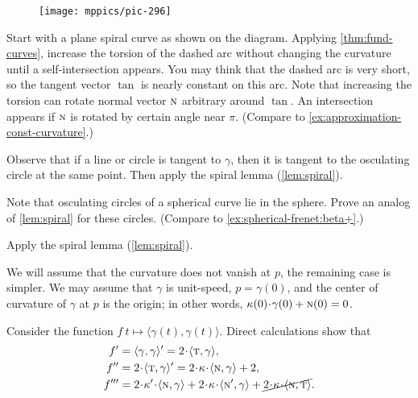 \begin{multicols}{2}
\begin{wrapfigure}{r}{15 mm}
\vskip-5mm
\centering
\texttt{[image: mppics/pic-296]}
\vskip-3mm
\end{wrapfigure}

Start with a plane spiral curve as shown on the diagram.
Applying \ref{thm:fund-curves}, increase the torsion of the dashed arc without changing the curvature until a self-intersection appears.
You may think that the dashed arc is very short, so the tangent vector $\tan$ is nearly constant on this arc. 
Note that increasing the torsion can rotate normal vector $\text{\sc{n}}$ arbitrary around $\tan$.
An intersection appears if $\text{\sc{n}}$ is rotated by certain angle near $\pi$.
(Compare to \ref{ex:approximation-const-curvature}.)

Observe that if a line or circle is tangent to $\gamma$,
then it is tangent to the osculating circle at the same point.
Then apply the spiral lemma (\ref{lem:spiral}).

Note that osculating circles of a spherical curve lie in the sphere.
Prove an analog of \ref{lem:spiral} for these circles.
(Compare to \ref{ex:spherical-frenet:beta+}.)



\setcounter{eqtn}{0}

Apply the spiral lemma (\ref{lem:spiral}).

We will assume that the curvature does not vanish at $p$, the remaining case is simpler.
We may assume that $\gamma$ is unit-speed, $p=\gamma(0)$,
and the center of curvature of $\gamma$ at $p$ is the origin;
in other words, $\kur(0)\cdot\gamma(0)+ \norm(0)=0$.

Consider the function $f\:t\mapsto \langle\gamma(t),\gamma(t)\rangle$.
Direct calculations show that 
\begin{align*}
f'
&=\langle\gamma,\gamma\rangle'
=2\cdot\langle\tan,\gamma\rangle,
\\
f''
&=2\cdot\langle\tan,\gamma\rangle'
=2\cdot\kur\cdot\langle\norm,\gamma\rangle+2,
\\
f'''
&=2\cdot\kur'\cdot\langle\norm,\gamma\rangle
+2\cdot\kur\cdot\langle\norm',\gamma\rangle+\cancel{2\cdot\kur\cdot\langle\norm,\tan\rangle}.
\end{align*}


\end{multicols}
